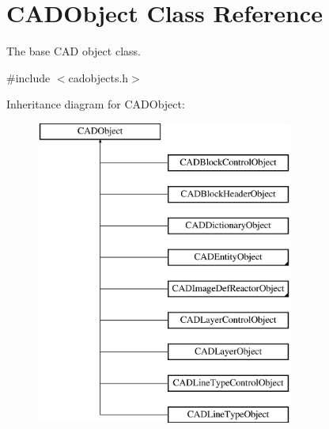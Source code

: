 \hypertarget{class_c_a_d_object}{}\section{C\+A\+D\+Object Class Reference}
\label{class_c_a_d_object}


The base C\+AD object class.  




{\ttfamily \#include $<$cadobjects.\+h$>$}

Inheritance diagram for C\+A\+D\+Object\+:\begin{figure}[H]
\begin{center}
\leavevmode
\includegraphics[height=10.000000cm]{class_c_a_d_object}
\end{center}
\end{figure}
